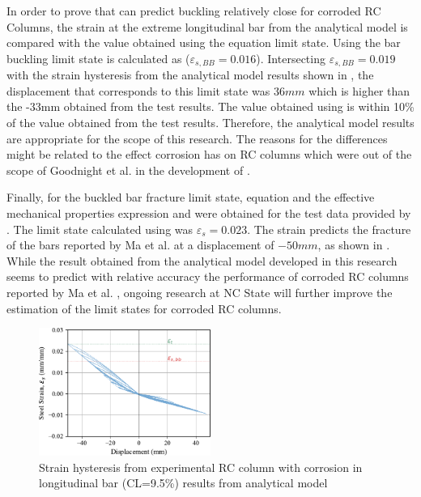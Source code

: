 In order to prove that  can predict buckling relatively close for corroded RC Columns, the strain at the extreme longitudinal bar from the analytical model is compared with the value obtained using the equation limit state. Using  the bar buckling limit state is calculated as ($\varepsilon_{s,BB}=0.016$). Intersecting  $\varepsilon_{s,BB}=0.019$  with the strain hysteresis from the analytical model results shown in , the displacement that corresponds to this limit state was $36 mm$ which is higher than the -33mm obtained from the test results. The value obtained using  is within 10\% of the value obtained from the test results. Therefore, the analytical model results are appropriate for the scope of this research. The reasons for the differences might be related to the effect corrosion has on RC columns which were out of the scope of Goodnight et al. in the development of .

Finally, for the buckled bar fracture limit state, equation  and the effective mechanical properties expression  and  were obtained for the test data provided by \cite{Ma2012}. The limit state calculated using  was $\varepsilon_{s}=0.023$. The strain predicts the fracture of the bars reported by Ma et al. \cite{Ma2012} at a displacement of $-50 mm$, as shown in . While the result obtained from the analytical model developed in this research seems to predict with relative accuracy the performance of corroded RC columns reported by Ma et al. \cite{Ma2012}, ongoing research at NC State will further improve the estimation of the limit states for corroded RC columns.

\begin{figure}[htbp]
	\centering
	\includegraphics[width=0.5\textwidth]{VAC Thesis 2.0/Chapter-5/figs/Calibration_Ma_et_al_strain.pdf}
	\caption{Strain hysteresis from experimental RC column with corrosion in longitudinal bar (CL=9.5\%) results from analytical model}
	\label{fig:ModelCalibration_Corrosion_Hysteresis}
\end{figure}

